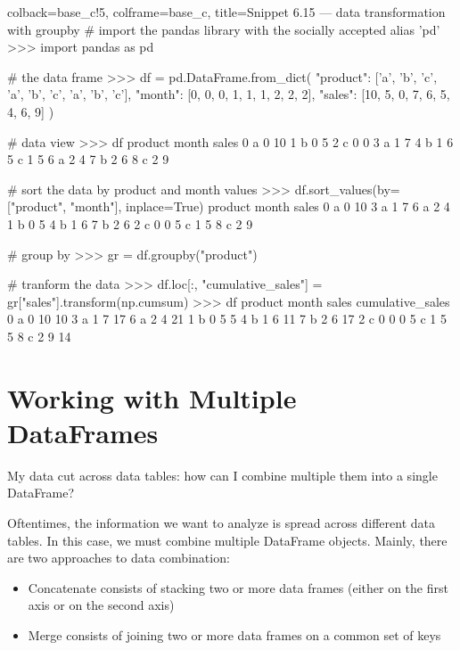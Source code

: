 \documentclass[a4paper,11pt]{book}
\numberwithin{figure}{chapter}
\numberwithin{table}{chapter}
\newcommand{\question}[1]{%
    \begin{tcolorbox}[colback=comp_c!10,colframe=comp_c,sidebyside align=top,width=\linewidth,before skip=1ex]
        #1
    \end{tcolorbox}
    \switchcolumn%
}
\newcommand{\note}[1]{%
    \begin{tcolorbox}[colback=white!0,colframe=white!10,width=\linewidth,before skip=1ex]
        #1
    \end{tcolorbox}
}
\begin{document}
\begin{pythoncode}[linenos=True]{colback=base_c!5, colframe=base_c, title=\sffamily Snippet 6.15 --- data transformation with groupby}
# import the pandas library with the socially accepted alias 'pd'
>>> import pandas as pd

# the data frame
>>> df = pd.DataFrame.from_dict(
	{
	    "product": ['a', 'b', 'c', 'a', 'b', 'c', 'a', 'b', 'c'],	
	    "month": [0, 0, 0, 1, 1, 1, 2, 2, 2],
	    "sales": [10,  5,  0,  7,  6,  5,  4,  6,  9]
	}
    )

# data view
>>> df
  product  month  sales
0       a      0     10
1       b      0      5
2       c      0      0
3       a      1      7
4       b      1      6
5       c      1      5
6       a      2      4
7       b      2      6
8       c      2      9


# sort the data by product and month values
>>> df.sort_values(by=["product", "month"], inplace=True)
  product  month  sales
0       a      0     10
3       a      1      7
6       a      2      4
1       b      0      5
4       b      1      6
7       b      2      6
2       c      0      0
5       c      1      5
8       c      2      9

# group by
>>> gr = df.groupby("product")

# tranform the data
>>> df.loc[:, "cumulative_sales"] = gr["sales"].transform(np.cumsum)
>>> df
  product  month  sales  cumulative_sales
0       a      0     10                10
3       a      1      7                17
6       a      2      4                21
1       b      0      5                 5
4       b      1      6                11
7       b      2      6                17
2       c      0      0                 0
5       c      1      5                 5
8       c      2      9                14
\end{pythoncode}
\clearpage
\section{Working with Multiple DataFrames}

\begin{paracol}{2}
	\question{\raggedright My data cut across data tables: how can I combine multiple them into a single DataFrame?}
	\note{Oftentimes, the information we want to analyze is spread across different data tables. In this case, we must combine multiple DataFrame objects. Mainly, there are two approaches to data combination:
		\begin{itemize}
			\item Concatenate consists of stacking two or more data frames (either on the first axis or on the second axis)
			\item Merge consists of joining two or more data frames on a common set of keys 
		\end{itemize}
	}
\end{paracol}
\end{document}
